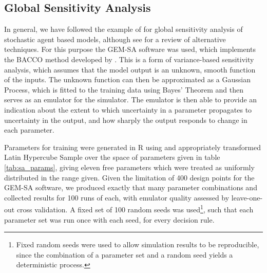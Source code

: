 \documentclass[graybox]{svmult}
\begin{document}
\subsection{Global Sensitivity Analysis}
\label{sub:sensitivity}

In general, we have followed the example of \cite{Bijak2013b} for global sensitivity analysis of stochastic agent based models, although see \citet{Thiele2014} for a review of alternative techniques. For this purpose the \ac{GEM-SA} software \citep{Kennedy} was used, which implements the \ac{BACCO} method developed by \citeauthor{Oakley2004} \citep{Oakley2002,Oakley2004,Dorresteijn2010}. This is a form of variance-based sensitivity analysis, which assumes that the model output is an unknown, smooth function of the inputs. The unknown function can then be approximated as a Gaussian Process, which is fitted to the training data using Bayes' Theorem and then serves as an emulator for the simulator. The emulator is then able to provide an indication about the extent to which uncertainty in a parameter propagates to uncertainty in the output, and how sharply the output responds to change in each parameter.

Parameters for training were generated in R \citep{RTeam2014} using and appropriately transformed Latin Hypercube Sample \citep{Carnell2012} over the space of parameters given in table \ref{tab:sa_params}, giving eleven free parameters which were treated as uniformly distributed in the range given.  Given the limitation of 400 design points for the \ac{GEM-SA} software, we produced exactly that many parameter combinations and collected results for 100 runs of each, with emulator quality assessed by leave-one-out cross validation. A fixed set of 100 random seeds was used\footnote{Fixed random seeds were used to allow simulation results to be reproducible, since the combination of a parameter set and a random seed yields a deterministic process.}, such that each parameter set was run once with each seed, for every decision rule.
\end{document}

